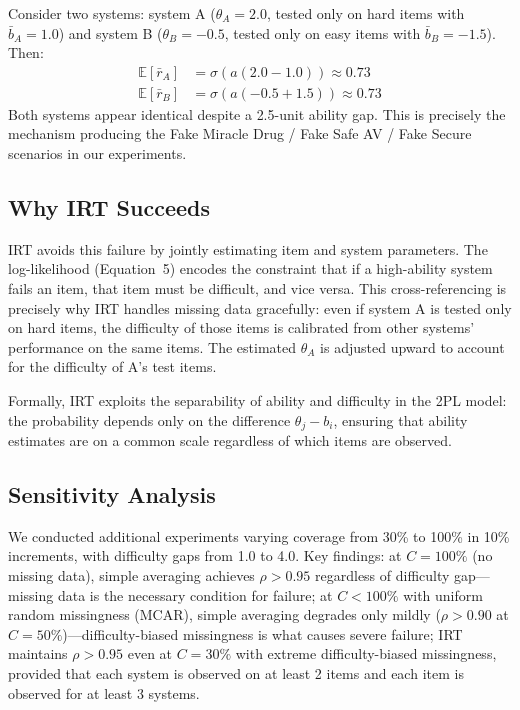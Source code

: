 \documentclass[11pt,a4paper]{article}
\begin{document}
Consider two systems: system A ($\theta_A = 2.0$, tested only on hard items with $\bar{b}_A = 1.0$) and system B ($\theta_B = -0.5$, tested only on easy items with $\bar{b}_B = -1.5$). Then:
\begin{align}
\mathbb{E}[\bar{r}_A] &= \sigma(a(2.0 - 1.0)) \approx 0.73 \\
\mathbb{E}[\bar{r}_B] &= \sigma(a(-0.5 + 1.5)) \approx 0.73
\end{align}
Both systems appear identical despite a 2.5-unit ability gap. This is precisely the mechanism producing the Fake Miracle Drug / Fake Safe AV / Fake Secure scenarios in our experiments.

\subsection{Why IRT Succeeds}

IRT avoids this failure by jointly estimating item and system parameters. The log-likelihood (Equation~5) encodes the constraint that if a high-ability system fails an item, that item must be difficult, and vice versa. This cross-referencing is precisely why IRT handles missing data gracefully: even if system A is tested only on hard items, the difficulty of those items is calibrated from other systems' performance on the same items. The estimated $\theta_A$ is adjusted upward to account for the difficulty of A's test items.

Formally, IRT exploits the separability of ability and difficulty in the 2PL model: the probability depends only on the difference $\theta_j - b_i$, ensuring that ability estimates are on a common scale regardless of which items are observed.

\subsection{Sensitivity Analysis}

We conducted additional experiments varying coverage from 30\% to 100\% in 10\% increments, with difficulty gaps from 1.0 to 4.0. Key findings: at $C = 100\%$ (no missing data), simple averaging achieves $\rho > 0.95$ regardless of difficulty gap---missing data is the necessary condition for failure; at $C < 100\%$ with uniform random missingness (MCAR), simple averaging degrades only mildly ($\rho > 0.90$ at $C = 50\%$)---difficulty-biased missingness is what causes severe failure; IRT maintains $\rho > 0.95$ even at $C = 30\%$ with extreme difficulty-biased missingness, provided that each system is observed on at least 2 items and each item is observed for at least 3 systems.
\end{document}
